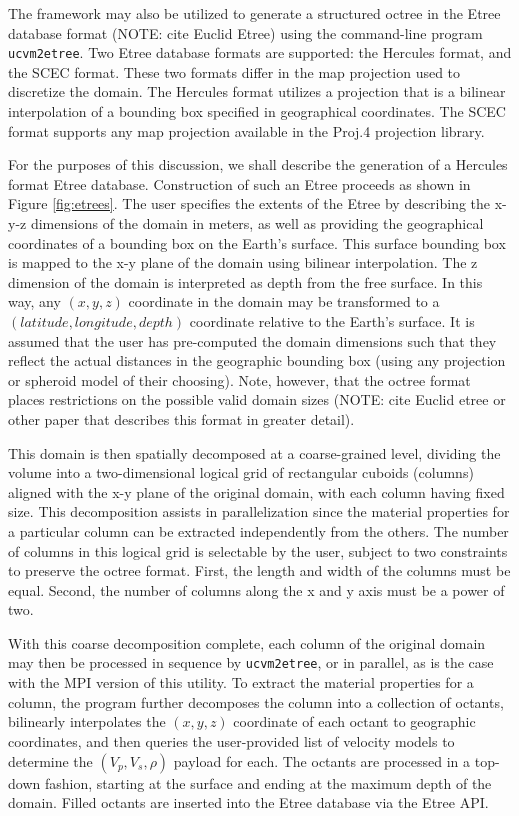 The framework may also be utilized to generate a structured octree in the Etree database format (NOTE: cite Euclid Etree) using the command-line program \texttt{ucvm2etree}. Two Etree database formats are supported: the Hercules format, and the SCEC format. These two formats differ in the map projection used to discretize the domain. The Hercules format utilizes a projection that is a bilinear interpolation of a bounding box specified in geographical coordinates. The SCEC format supports any map projection available in the Proj.4 projection library.

For the purposes of this discussion, we shall describe the generation of a Hercules format Etree database. Construction of such an Etree proceeds as shown in Figure \ref{fig:etrees}. The user specifies the extents of the Etree by describing the x-y-z dimensions of the domain in meters, as well as providing the geographical coordinates of a bounding box on the Earth's surface. This surface bounding box is mapped to the x-y plane of the domain using bilinear interpolation. The z dimension of the domain is interpreted as depth from the free surface. In this way, any $(x,y,z)$ coordinate in the domain may be transformed to a $(latitude, longitude, depth)$ coordinate relative to the Earth's surface. It is assumed that the user has pre-computed the domain dimensions such that they reflect the actual distances in the geographic bounding box (using any projection or spheroid model of their choosing). Note, however, that the octree format places restrictions on the possible valid domain sizes (NOTE: cite Euclid etree or other paper that describes this format in greater detail).

This domain is then spatially decomposed at a coarse-grained level, dividing the volume into a two-dimensional logical grid of rectangular cuboids (columns) aligned with the x-y plane of the original domain, with each column having fixed size. This decomposition assists in parallelization since the material properties for a particular column can be extracted independently from the others. The number of columns in this logical grid is selectable by the user, subject to two constraints to preserve the octree format. First, the length and width of the columns must be equal. Second, the number of columns along the x and y axis must be a power of two.

With this coarse decomposition complete, each column of the original domain may then be processed in sequence by \texttt{ucvm2etree}, or in parallel, as is the case with the MPI version of this utility. To extract the material properties for a column, the program further decomposes the column into a collection of octants, bilinearly interpolates the $(x,y,z)$ coordinate of each octant to geographic coordinates, and then queries the user-provided list of velocity models to determine the $(V_p, V_s, \rho)$ payload for each. The octants are processed in a top-down fashion, starting at the surface and ending at the maximum depth of the domain. Filled octants are inserted into the Etree database via the Etree API.


